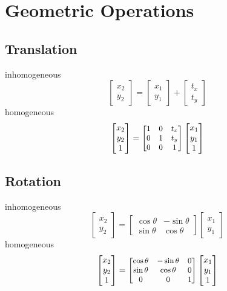 \section{Geometric Operations}
\subsection{Translation}
inhomogeneous
\[\begin{bmatrix}
  x_2\\
  y_2
\end{bmatrix}=
\begin{bmatrix}
  x_1\\
  y_1
\end{bmatrix}+
\begin{bmatrix}
  t_x\\
  t_y
\end{bmatrix}\]
homogeneous
\[\begin{bmatrix}
  x_2\\
  y_2\\
  1
\end{bmatrix}=
{\small
\begin{bmatrix}
  1 & 0 & t_x\\
  0 & 1 & t_y\\
  0 & 0 & 1
\end{bmatrix}
}
\begin{bmatrix}
  x_1\\
  y_1\\
  1
\end{bmatrix}
\]
\subsection{Rotation}
inhomogeneous
\[\begin{bmatrix}
  x_2\\
  y_2
\end{bmatrix} =
\begin{bmatrix}
  \cos{\theta} & -\sin{\theta}\\
  \sin{\theta} & \cos{\theta}
\end{bmatrix}
\begin{bmatrix}
  x_1\\
  y_1
\end{bmatrix}\]
homogeneous
\[\begin{bmatrix}
  x_2\\
  y_2\\
  1
\end{bmatrix}=
{\small
\begin{bmatrix}
  \cos{\theta}  & -\sin{\theta}  & 0\\
  \sin{\theta}  & \cos{\theta}   & 0\\
  0 & 0 & 1
\end{bmatrix}}
\begin{bmatrix}
  x_1\\
  y_1\\
  1
\end{bmatrix}\]
